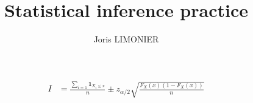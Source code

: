 \documentclass{article}
\title{Statistical inference practice}
\author{Joris LIMONIER}
\begin{document}
\maketitle

\begin{align*}
    I &= \frac{\sum_{i=1}{\boldsymbol{1}_{X_i \leq x}}}{n} \pm z_{\alpha/2} \sqrt{\frac{F_X(x) (1 - F_X(x))}{n}}
\end{align*}
\end{document}
